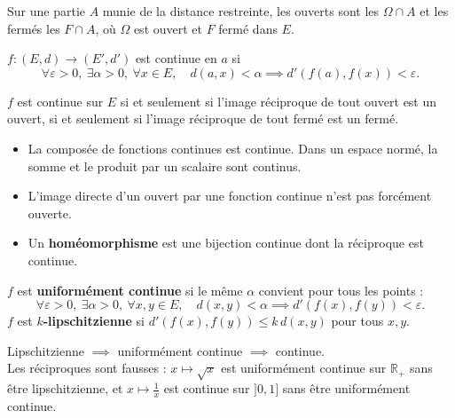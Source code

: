 \documentclass[11pt]{article}
\renewcommand{\leq}{\leqslant}\renewcommand{\geq}{\geqslant}
\newcommand{\R}{\mathbb{R}}
\begin{document}
\begin{ldef}
Sur une partie $A$ munie de la distance restreinte, les ouverts sont les $\Omega\cap A$ et les fermés les $F\cap A$, où $\Omega$ est ouvert et $F$ fermé dans $E$.
\end{ldef}


\begin{ldef}
$f : (E,d)\to(E',d')$ est continue en $a$ si
\[\forall\varepsilon>0,\ \exists\alpha>0,\ \forall x\in E,\quad d(a,x)<\alpha\implies d'(f(a),f(x))<\varepsilon.\]
\end{ldef}

\begin{lthm}
$f$ est continue sur $E$ si et seulement si l'image réciproque de tout ouvert est un ouvert, si et seulement si l'image réciproque de tout fermé est un fermé.
\end{lthm}

\begin{itemize}
\item La composée de fonctions continues est continue. Dans un espace normé, la somme et le produit par un scalaire sont continus.
\item L'image directe d'un ouvert par une fonction continue n'est pas forcément ouverte.
\item Un \textbf{homéomorphisme} est une bijection continue dont la réciproque est continue.
\end{itemize}

\begin{ldef}
$f$ est \textbf{uniformément continue} si le même $\alpha$ convient pour tous les points :
\[\forall\varepsilon>0,\ \exists\alpha>0,\ \forall x,y\in E,\quad d(x,y)<\alpha\implies d'(f(x),f(y))<\varepsilon.\]
$f$ est \textbf{$k$-lipschitzienne} si $d'(f(x),f(y))\leq k\,d(x,y)$ pour tous $x,y$.
\end{ldef}

\begin{lthm}
Lipschitzienne $\implies$ uniformément continue $\implies$ continue. \\
Les réciproques sont fausses : $x\mapsto\sqrt x$ est uniformément continue sur $\R_+$ sans être lipschitzienne, et $x\mapsto\frac1x$ est continue sur $]0,1]$ sans être uniformément continue.
\end{lthm}

\end{document}
